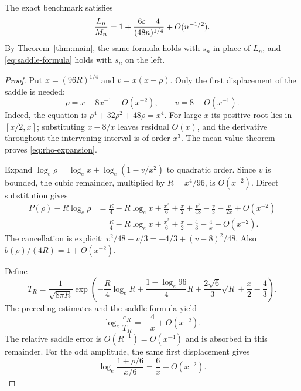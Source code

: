 \begin{theorem}\label{thm:elementary}
The exact benchmark satisfies
\begin{equation}\label{eq:elementary-error}
 \frac{L_n}{M_n}=1+\frac{6\varepsilon-4}{(48n)^{1/4}}+O(n^{-1/2}).
\end{equation}
By Theorem~\ref{thm:main}, the same formula
holds with $s_n$ in place of $L_n$, and
\eqref{eq:saddle-formula} holds with $s_n$ on the left.
\end{theorem}
\begin{proof}
Put $x=(96R)^{1/4}$ and $v=x(x-\rho)$. Only the first displacement
of the saddle is needed:
\begin{equation}\label{eq:rho-expansion}
 \rho=x-8x^{-1}+O(x^{-2}),\qquad v=8+O(x^{-1}).
\end{equation}
Indeed, the equation is $\rho^4+32\rho^2+48\rho=x^4$.
For large $x$ its positive root lies in $[x/2,x]$; substituting
$x-8/x$ leaves residual $O(x)$, and the derivative throughout the
intervening interval is of order $x^3$. The mean value theorem proves
\eqref{eq:rho-expansion}.

Expand $\log_e\rho=\log_ex+\log_e(1-v/x^2)$ to quadratic order.
Since $v$ is bounded, the cubic remainder, multiplied by $R=x^4/96$,
is $O(x^{-2})$. Direct substitution gives
\begin{align*}
 P(\rho)-R\log_e\rho
 &=\frac R4-R\log_ex+\frac{x^2}{6}+\frac x2
       +\frac{v^2}{48}-\frac v3-\frac{v}{2x}+O(x^{-2})\\
 &=\frac R4-R\log_ex+\frac{x^2}{6}+\frac x2
       -\frac43-\frac4x+O(x^{-2}).
\end{align*}
The cancellation is explicit: $v^2/48-v/3=-4/3+(v-8)^2/48$.
Also $b(\rho)/(4R)=1+O(x^{-2})$.

Define
\[
 T_R=\frac{1}{\sqrt{8\pi R}}\exp\left(
 -\frac R4\log_eR+\frac{1-\log_e96}{4}R
 +\frac{2\sqrt6}{3}\sqrt R+\frac x2-\frac43\right).
\]
The preceding estimates and the saddle formula yield
\begin{equation}\label{eq:log-coefficient-expansion}
 \log_e\frac{c_R}{T_R}=-\frac4x+O(x^{-2}).
\end{equation}
The relative saddle error is $O(R^{-1})=O(x^{-4})$ and is absorbed
in this remainder. For the odd amplitude, the same first displacement gives
\begin{equation}\label{eq:odd-amplitude-expansion}
 \log_e\frac{1+\rho/6}{x/6}=\frac6x+O(x^{-2}).
\end{equation}


\end{proof}
